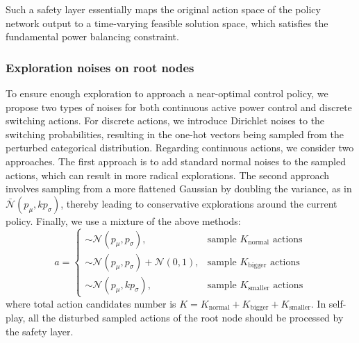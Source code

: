 Such a safety layer essentially maps the original action space of the policy network output to a time-varying feasible solution space, which satisfies the fundamental power balancing constraint. 

\subsubsection*{Exploration noises on root nodes}

To ensure enough exploration to approach a near-optimal control policy, we propose two types of noises for both continuous active power control and discrete switching actions. 
For discrete actions, we introduce Dirichlet noises to the switching probabilities, resulting in the one-hot vectors being sampled from the perturbed categorical distribution. Regarding continuous actions, we consider two approaches. The first approach is to add standard normal noises to the sampled actions, which can result in more radical explorations. The second approach involves sampling from a more flattened Gaussian by doubling the variance, as in $\bar{\mathcal{N}}(p_\mu, kp_\sigma)$, thereby leading to conservative explorations around the current policy. Finally, we use a mixture of the above methods:
\begin{equation}
    a=
    \left\{
             \begin{array}{lr}
             \sim\mathcal{N}(p_\mu, p_\sigma), & \text{sample $K_{\text{normal}}$ actions} \\ 
             \sim\mathcal{N}(p_\mu, p_\sigma)+\mathcal{N}(0,1), & \text{sample $K_{\text{bigger}}$ actions} \\
             \sim\mathcal{N}(p_\mu, kp_\sigma), & \text{sample $K_{\text{smaller}}$ actions}
             \end{array}
    \right.
\end{equation}
where total action candidates number is $K=K_{\text{normal}}+K_{\text{bigger}}+K_{\text{smaller}}$. In self-play, all the disturbed sampled actions of the root node should be processed by the safety layer.

